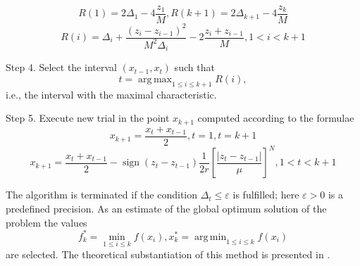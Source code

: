 \documentclass[procedia]{easychair}
\DeclareMathOperator*{\argmax}{arg\,max}
\DeclareMathOperator*{\argmin}{arg\,min}
\DeclareMathOperator{\sign}{sign}
\begin{document}
\begin{equation}
\label{step3_1}
R(1)=2\Delta_1-4\dfrac{z_1}{M},R(k+1)=2\Delta_{k+1}-4\dfrac{z_k}{M}
\end{equation}
\begin{equation}
\label{step3_2}
R(i)=\Delta_i+\dfrac{(z_i-z_{i-1})^2}{M^2\Delta_i}-2\dfrac{z_i+z_{i-1}}{M},1<i<k+1
\end{equation}
\par
Step 4. Select the interval \((x_{t-1}, x_t)\) such that
\begin{equation}
\label{step4}
t=\argmax_{1\leqslant i \leqslant k+1}R(i),
\end{equation}
i.e., the interval with the maximal characteristic.
\par
Step 5. Execute new trial in the point \(x_{k+1}\) computed according to the formulae
\begin{displaymath}
x_{k+1}=\dfrac{x_{t}+x_{t-1}}{2},t=1,t=k+1
\end{displaymath}
\begin{equation}
\label{step5}
x_{k+1}=\dfrac{x_{t}+x_{t-1}}{2}-\sign(z_{t}-z_{t-1})\dfrac{1}{2r}\left[\dfrac{|z_{t}-z_{t-1}|}{\mu}\right]^N,1<t<k+1
\end{equation}
\par
The algorithm is terminated if the condition \(\Delta_{t}\leqslant \varepsilon\) is fulfilled;
here \(\varepsilon>0\) is a predefined precision. As an estimate of the global optimum solution of the problem the values
\begin{equation}
f_k^*=\min_{1\leqslant i \leqslant k}f(x_i), x_k^*=\argmin_{1\leqslant i \leqslant k}f(x_i)
\end{equation}
are selected. The theoretical substantiation of this method is presented in \cite{strOptBook}.

\end{document}
